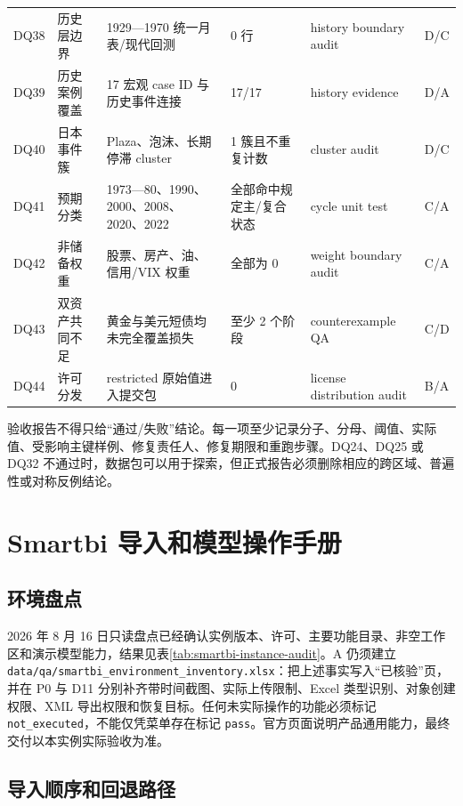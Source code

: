\documentclass[UTF8,fontset=windows,12pt,openany]{ctexbook}
\newcommand{\Field}[1]{{\small\nolinkurl{#1}}}
\newcommand{\File}[1]{{\small\nolinkurl{#1}}}
\begin{document}
\begin{landscape}
\begin{longtable}{p{1.7cm}p{4.0cm}p{4.6cm}p{3.0cm}p{3.2cm}p{2.7cm}}
DQ38 & 历史层边界 & 1929—1970 统一月表/现代回测 & 0 行 & history boundary audit & D/C\\
DQ39 & 历史案例覆盖 & 17 宏观 case ID 与历史事件连接 & 17/17 & history evidence & D/A\\
DQ40 & 日本事件簇 & Plaza、泡沫、长期停滞 cluster & 1 簇且不重复计数 & cluster audit & D/C\\
DQ41 & 预期分类 & 1973—80、1990、2000、2008、2020、2022 & 全部命中规定主/复合状态 & cycle unit test & C/A\\
DQ42 & 非储备权重 & 股票、房产、油、信用/VIX 权重 & 全部为 0 & weight boundary audit & C/A\\
DQ43 & 双资产共同不足 & 黄金与美元短债均未完全覆盖损失 & 至少 2 个阶段 & counterexample QA & C/D\\
DQ44 & 许可分发 & restricted 原始值进入提交包 & 0 & license distribution audit & B/A\\
\bottomrule
\end{longtable}
\end{landscape}

验收报告不得只给“通过/失败”结论。每一项至少记录分子、分母、阈值、实际值、受影响主键样例、修复责任人、修复期限和重跑步骤。DQ24、DQ25 或 DQ32 不通过时，数据包可以用于探索，但正式报告必须删除相应的跨区域、普遍性或对称反例结论。

\chapter{Smartbi 导入和模型操作手册}

\section{环境盘点}

2026 年 8 月 16 日只读盘点已经确认实例版本、许可、主要功能目录、非空工作区和演示模型能力，结果见表\ref{tab:smartbi-instance-audit}。A 仍须建立 \File{data/qa/smartbi_environment_inventory.xlsx}：把上述事实写入“已核验”页，并在 P0 与 D11 分别补齐带时间截图、实际上传限制、Excel 类型识别、对象创建权限、XML 导出权限和恢复目标。任何未实际操作的功能必须标记 \Field{not_executed}，不能仅凭菜单存在标记 \Field{pass}。官方页面说明产品通用能力\cite{smartbiversion,smartbiprepare,smartbiaichat}，最终交付以本实例实际验收为准。

\section{导入顺序和回退路径}
\end{document}
